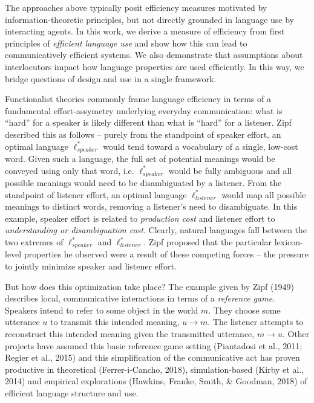 \documentclass[10pt, letterpaper]{article}
\begin{document}
The approaches above typically posit efficiency measures motivated by
information-theoretic principles, but not directly grounded in language
use by interacting agents. In this work, we derive a measure of
efficiency from first principles of \textit{efficient language use} and
show how this can lead to communicatively efficient systems. We also
demonstrate that assumptions about interlocutors impact how language
properties are used efficiently. In this way, we bridge questions of
design and use in a single framework.\par

Functionalist theories commonly frame language efficiency in terms of a
fundamental effort-assymetry underlying everyday communication: what is
``hard'' for a speaker is likely different than what is ``hard'' for a
listener. Zipf described this as follows -- purely from the standpoint
of speaker effort, an optimal language \(\ell_{speaker}^*\) would tend
toward a vocabulary of a single, low-cost word. Given such a language,
the full set of potential meanings would be conveyed using only that
word, i.e. \(\ell_{speaker}^*\) would be fully ambiguous and all
possible meanings would need to be disambiguated by a listener. From the
standpoint of listener effort, an optimal language \(\ell_{listener}^*\)
would map all possible meanings to distinct words, removing a listener's
need to disambiguate. In this example, speaker effort is related to
\emph{production cost} and listener effort to \emph{understanding or
disambiguation cost}. Clearly, natural languages fall between the two
extremes of \(\ell_{speaker}^*\) and \(\ell_{listener}^*\). Zipf
proposed that the particular lexicon-level properties he observed were a
result of these competing forces -- the pressure to jointly minimize
speaker and listener effort.\par

But how does this optimization take place? The example given by Zipf
(1949) describes local, communicative interactions in terms of a
\textit{reference game}. Speakers intend to refer to some object in the
world \(m\). They choose some utterance \(u\) to transmit this intended
meaning, \(u \rightarrow m\). The listener attempts to reconstruct this
intended meaning given the transmitted utterance, \(m \rightarrow u\).
Other projects have assumed this basic reference game setting
(Piantadosi et al., 2011; Regier et al., 2015) and this simplification
of the communicative act has proven productive in theoretical
(Ferrer-i-Cancho, 2018), simulation-based (Kirby et al., 2014) and
empirical explorations (Hawkins, Franke, Smith, \& Goodman, 2018) of
efficient language structure and use.\par
\end{document}
